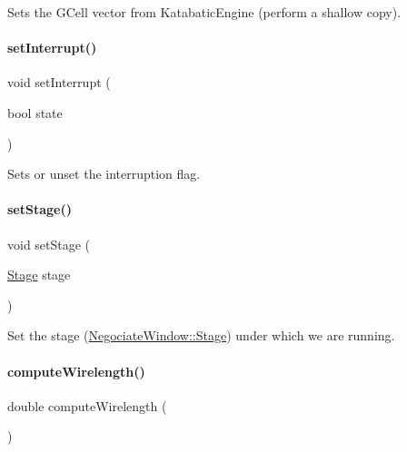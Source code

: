 Sets the G\+Cell vector from Katabatic\+Engine (perform a shallow copy). \mbox{\label{classKite_1_1NegociateWindow_a7c0d10dab2d32985e942b7678dcccafd}} 
\paragraph{\texorpdfstring{set\+Interrupt()}{setInterrupt()}}
{\footnotesize\ttfamily void set\+Interrupt (\begin{DoxyParamCaption}\item[{bool}]{state }\end{DoxyParamCaption})\hspace{0.3cm}{\ttfamily [inline]}}

Sets or unset the interruption flag. \mbox{\label{classKite_1_1NegociateWindow_aad6b43971b936f7ea003d3ad0fd07532}} 
\paragraph{\texorpdfstring{set\+Stage()}{setStage()}}
{\footnotesize\ttfamily void set\+Stage (\begin{DoxyParamCaption}\item[{\mbox{\hyperlink{classKite_1_1NegociateWindow_aca8133200c1122e29b87b314d82604eb}{Stage}}}]{stage }\end{DoxyParamCaption})\hspace{0.3cm}{\ttfamily [inline]}}

Set the stage (\mbox{\hyperlink{classKite_1_1NegociateWindow_aca8133200c1122e29b87b314d82604eb}{Negociate\+Window\+::\+Stage}}) under which we are running. \mbox{\label{classKite_1_1NegociateWindow_a4936106670361df6b6f3ef0b6088c9dc}} 
\paragraph{\texorpdfstring{compute\+Wirelength()}{computeWirelength()}}
{\footnotesize\ttfamily double compute\+Wirelength (\begin{DoxyParamCaption}{ }\end{DoxyParamCaption})}

